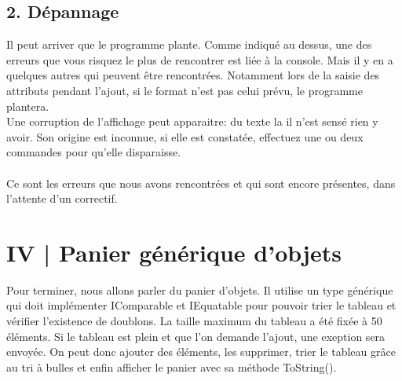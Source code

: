 \documentclass[11pt]{article}
\begin{document}
\newpage
    \subsection*{2. Dépannage}
    Il peut arriver que le programme plante. Comme indiqué au dessus, une des erreurs que vous risquez le plus de rencontrer est liée à la console. Mais il y en a quelques autres qui peuvent être rencontrées. Notamment lors de la saisie des attributs pendant l'ajout, si le format n'est pas celui prévu, le programme plantera. 
    \\
    Une corruption de l'affichage peut apparaitre: du texte la il n'est sensé rien y avoir. Son origine est inconnue, si elle est constatée, effectuez une ou deux commandes pour qu'elle disparaisse.
    \\\\
    Ce sont les erreurs que nous avons rencontrées et qui sont encore présentes, dans l'attente d'un correctif.
\newpage
    \section*{IV | Panier générique d'objets}
    Pour terminer, nous allons parler du panier d'objets. Il utilise un type générique qui doit implémenter IComparable et IEquatable pour pouvoir trier le tableau et vérifier l'existence de doublons. 
    La taille maximum du tableau a été fixée à 50 éléments. Si le tableau est plein et que l'on demande l'ajout, une exeption sera envoyée. On peut donc ajouter des éléments, les supprimer, trier le tableau grâce au tri à bulles et enfin afficher le panier avec sa méthode ToString().
\end{document}
